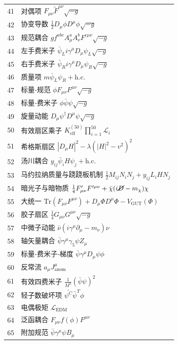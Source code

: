 \documentclass[11pt,a4paper]{article}
\begin{document}
\begin{longtable}{r l}
		41 & 对偶项 \(F_{\mu\nu}\tilde{F}^{\mu\nu}\sqrt{-g}\) \\
		42 & 协变导数 \(\frac{1}{2}D_\mu\phi D^\mu\phi\sqrt{-g}\) \\
		43 & 规范耦合 \(g f^{abc}A^a_\mu A^b_\nu F^{c\mu\nu}\sqrt{-g}\) \\
		44 & 左手费米子 \(\bar{\psi}_L i\gamma^\mu D_\mu\psi_L\sqrt{-g}\) \\
		45 & 右手费米子 \(\bar{\psi}_R i\gamma^\mu D_\mu\psi_R\sqrt{-g}\) \\
		46 & 质量项 \(m\bar{\psi}_L\psi_R + \text{h.c.}\) \\
		47 & 标量‑规范 \(\phi F_{\mu\nu}F^{\mu\nu}\sqrt{-g}\) \\
		48 & 标量‑费米子 \(\phi\bar{\psi}\psi\sqrt{-g}\) \\
		49 & 旋量动能 \(D_\mu\psi^\dagger D^\mu\psi\sqrt{-g}\) \\
		50 & 有效扇区乘子 \(K^{(50)}_{\mathrm{eff}}\prod_{i=1}^{50}\mathcal{L}_i\) \\
		51 & 希格斯扇区 \(|D_\mu H|^2 - \lambda(|H|^2 - v^2)^2\) \\
		52 & 汤川耦合 \(y_{ij}\bar{\psi}_i H\psi_j + \text{h.c.}\) \\
		53 & 马约拉纳质量与跷跷板机制 \(\frac{1}{2}M_{ij}N_i N_j + y_{ij}L_i H N_j\) \\
		54 & 暗光子与暗物质 \(\frac{1}{4}F'_{\mu\nu}F'^{\mu\nu} + \bar{\chi}(i\cancel{D} - m_\chi)\chi\) \\
		55 & 大统一 \(\mathrm{Tr}(F_{\mu\nu}F^{\mu\nu}) + D_\mu\Phi D^\mu\Phi - V_{\text{GUT}}(\Phi)\) \\
		56 & 胶子扇区 \(\frac{1}{4}G_{\mu\nu}G^{\mu\nu}\sqrt{-g}\) \\
		57 & 中微子动能 \(\bar{\nu}(i\gamma^\mu\partial_\mu - m_\nu)\nu\) \\
		58 & 轴矢量耦合 \(\bar{\psi}\gamma^\mu\gamma_5\psi Z_\mu\) \\
		59 & 标量‑费米子‑梯度 \(\bar{\psi}\gamma^\mu D_\mu\psi\phi\) \\
		60 & 反常流 \(a_\mu J^\mu_{\text{anom}}\) \\
		61 & 有效四费米子 \(\frac{1}{M^2}(\bar{\psi}\psi)^2\) \\
		62 & 轻子数破坏项 \(\bar{\psi^C}\bar{\psi}^T\phi\) \\
		63 & 电偶极矩 \(\mathcal{L}_{\text{EDM}}\) \\
		64 & 泛函耦合 \(F_{\mu\nu}f(\phi)F^{\mu\nu}\) \\
		65 & 附加规范 \(\bar{\psi}\gamma^\mu\psi B_\mu\) \\

\end{longtable}
\end{document}
